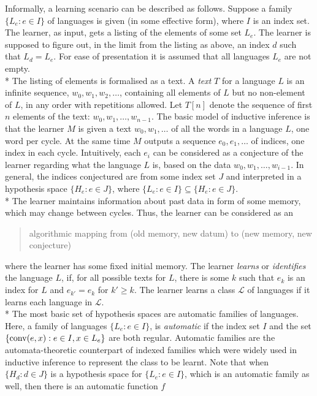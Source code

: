 \documentclass{LMCS}
\newcommand{\CalL}{{\mathcal L}}
\theoremstyle{plain}\newtheorem{athm}[thm]{Theorem}
\theoremstyle{plain}\newtheorem{aprop}[thm]{Proposition}
\theoremstyle{plain}\newtheorem{aprob}[thm]{Open Problem}
\theoremstyle{plain}\newtheorem{acor}[thm]{Corollary}
\theoremstyle{plain}\newtheorem{alem}[thm]{Lemma}
\theoremstyle{definition}\newtheorem{adefn}[thm]{Definition}
\theoremstyle{definition}\newtheorem{arem}[thm]{Remark}
\theoremstyle{plain}\newtheorem{aexmp}[thm]{Example}
\theoremstyle{plain}\newtheorem{aclm}[thm]{Claim}
\def\conv{{\rm{conv}}}
\def\sp{\\*\indent}
\begin{document}
Informally, a learning scenario can be described as follows.
Suppose a family $\{L_e: e \in I\}$ of languages is given (in some effective
form), where $I$ is an index set.
The learner, as input, gets a listing of the elements of some set $L_e$.
The learner is supposed to figure out, 
in the limit from the listing as above, an index $d$ such that $L_d = L_e$. 
For ease of presentation it is assumed that all languages $L_e$
are not empty.
\sp
The listing of elements is formalised as a text.
A {\em text} $T$ for a language $L$ is an infinite sequence,
$w_0, w_1, w_2, \ldots$, containing all elements of $L$ but no
non-element of $L$, in any order with repetitions allowed. 
Let $T[n]$ denote the sequence of first $n$ elements of the text:
$w_0, w_1,\ldots, w_{n-1}$.
The basic model of inductive inference \cite{An80,BB75,Go67,JORS99,OSW86}
is that the learner $M$ is given a text $w_0,w_1,\ldots$
of all the words in a language $L$, one word per cycle.
At the same time $M$ outputs a sequence $e_0,e_1,\ldots$ of indices, 
one index in each cycle. Intuitively, each $e_i$ can be considered
as a conjecture of the learner regarding what the language $L$ is,
based on the data $w_0,w_1,\ldots,w_{i-1}$. In general, the indices
conjectured are from some index set $J$ and 
interpreted in a hypothesis space $\{H_e: e \in J\}$, where
$\{L_e: e \in I\} \subseteq \{H_e: e \in J\}$.
\sp
The learner maintains information about past data in
form of some memory, which may change between cycles.
Thus, the learner can be considered as an
\begin{quote}
algorithmic mapping from (old memory, new datum) to
(new memory, new conjecture)
\end{quote}
where the learner has some fixed initial memory.
The learner {\em learns} or {\em identifies} the language $L$, if,
for all possible texts for $L$, there is some $k$
such that $e_k$ is an index for $L$ and
$e_{k'}=e_k$ for $k' \geq k$. The learner learns a class $\CalL$ of
languages if it learns each language in $\CalL$.
\sp
The most basic set of hypothesis spaces are
automatic families of languages. Here, a family of
languages $\{L_e: e \in I\}$, is {\em automatic} if the index set $I$ and
the set $\{\conv(e,x): e \in I, x \in L_e\}$ are both regular. 
Automatic families \cite{JLS09,JOPS10} are the automata-theoretic 
counterpart of indexed families \cite{An80,LZZ08} which were widely used
in inductive inference to represent the class to be learnt.
Note that when $\{H_d: d \in J\}$ is a hypothesis space for $\{L_e: e \in I\}$,
which is an automatic family as well, then there is an automatic function $f$
\end{document}
